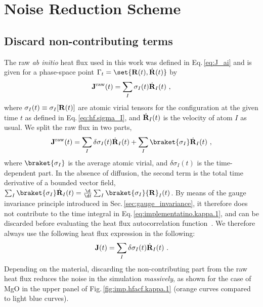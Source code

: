


\section{Noise Reduction Scheme}
\subsection{Discard non-contributing terms}
The raw \emph{ab initio} heat flux used in this work was defined in Eq.\,\eqref{eq:J_ai} and is given for a phase-space point $\Gamma_t = \set{{\bf R} (t), \dot{\bf R} (t)}$ by
\begin{align}
	{\bf J}^{\rm raw} (t) = \sum_I \sigma_I (t)  \dot{\bf R}_I (t)~,
	\label{eq:imp.J.0}
\end{align}
where $\sigma_I (t) \equiv \sigma_I [{\bf R} (t)]$ are atomic virial tensors for the configuration at the given time $t$ as defined in Eq.\,\eqref{eq:hf.sigma_I}, and $\dot{\bf R}_I (t)$ is the velocity of atom $I$ as usual. We split the raw flux in two parts,
\begin{align}
	{\bf J}^{\rm raw} (t)
		= \sum_I \delta \sigma_I (t) \dot{\bf R}_I (t) 
		+ \sum_I \braket{\sigma_I} \dot{\bf R}_I (t)~,
	\label{eq:imp.J.1}
\end{align}
where $\braket{\sigma_I}$ is the average atomic virial, and $\delta \sigma_I (t)$ is the time-dependent part. In the absence of diffusion, the second term is the total time derivative of a bounded vector field, $\sum_I \braket{\sigma_I} \dot{\bf R}_I (t) = \frac{\d}{\d t} \sum_I \braket{\sigma_I} {\bf R}_I (t)$. By means of the gauge invariance principle introduced in Sec.\,\ref{sec:gauge_invariance}, it therefore does not contribute to the time integral in Eq.\,\eqref{eq:implementatino.kappa.1}, and can be discarded before evaluating the heat flux autocorrelation function~\cite{Ercole2016}. We therefore always use the following heat flux expression in the following:
\begin{align}
	{\bf J} (t)
		= \sum_I \delta \sigma_I (t) \dot{\bf R}_I (t)~.
	\label{eq:imp.J}
\end{align}
Depending on the material, discarding the non-contributing part from the raw heat flux reduces the noise in the simulation \emph{massively}, as shown for the case of MgO in the upper panel of Fig.\,\ref{fig:imp.hfacf.kappa.1} (orange curves compared to light blue curves).
